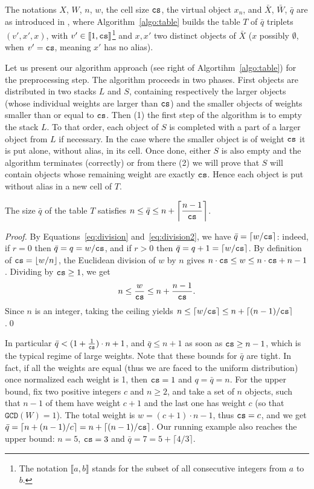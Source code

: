 
The notations $X$, $W$, $n$, $w$, the cell size $\texttt{cs}$, the virtual object $x_n$, and $\bar{X}$, $\bar{W}$,
$\bar{q}$ are as introduced in , where Algorithm~\ref{algo:table} builds the table $T$ of
$\bar{q}$ triplets $(v', x', x)$, with $v' \in \llbracket 1, \texttt{cs} \rrbracket$\footnote{The notation
$\llbracket a, b \rrbracket$ stands for the subset of all consecutive integers from $a$ to $b$.} and $x, x'$
two distinct objects of $\bar{X}$ ($x$ possibly $\emptyset$, when $v'=\texttt{cs}$, meaning $x'$ has no alias). 

Let us present our algorithm approach (see right of  Algortihm~\ref{algo:table}) for the preprocessing step.
The algorithm proceeds in two phases. 
First objects are distributed in two stacks $L$ and $S$,
containing respectively the larger objects (whose individual weights
are larger than $\texttt{cs}$)
and the smaller objects of weights smaller than or equal to $\texttt{cs}$. Then
(1) the first step of the algorithm is to empty the stack $L$.
To that order, each object of $S$ is completed with a part of a larger object from $L$
if necessary. In the case where the smaller object is of weight $\texttt{cs}$ it is put alone, without alias, in its cell.
Once done,  either $S$ is also empty and the algorithm terminates (correctly)
or from there (2) we will prove that $S$ will contain objects whose remaining weight are exactly $\texttt{cs}$. Hence each object is put
without alias in a new cell of $T$.


\begin{proposition}
\label{prop:size_table}
    The size $\bar{q}$ of the table $T$ satisfies $\displaystyle{n \leq \bar{q} \leq n + \left\lceil \frac{n-1}{\texttt{cs}} \right\rceil}$.
\end{proposition}
\begin{proof}
    By Equations~\eqref{eq:division} and~\eqref{eq:division2}, we have $\bar{q} = \lceil w/\texttt{cs} \rceil$:
    indeed, if $r=0$ then $\bar{q} = q = w/\texttt{cs}$, and if $r>0$ then $\bar{q} = q+1 = \lceil w/\texttt{cs} \rceil$.
    By definition of $\texttt{cs} = \lfloor w/n \rfloor$, the Euclidean division of $w$ by $n$ gives
    $n \cdot \texttt{cs} \leq w \leq n\cdot \texttt{cs} + n - 1$. Dividing by $\texttt{cs} \geq 1$, we get
    \[
        n \leq \frac{w}{\texttt{cs}} \leq n + \frac{n-1}{\texttt{cs}}.
    \]
    Since $n$ is an integer, taking the ceiling yields $n \leq \lceil w/\texttt{cs} \rceil \leq n + \lceil (n-1)/\texttt{cs} \rceil$.\qed
\end{proof}
In particular $\bar{q} < (1+\frac{1}{\texttt{cs}})\cdot n + 1$, and $\bar{q} \leq n+1$ as soon as $\texttt{cs} \geq n-1$,
which is the typical regime of large weights.
Note that these bounds for $\bar{q}$ are tight. In fact, if all the weights are equal (thus we are faced to the uniform distribution)
once normalized each weight is 1, then $\texttt{cs} = 1$ and $q=\bar{q} = n$.
For the upper bound, fix two positive integers $c$ and $n \geq 2$, and take a set of $n$ objects, such that
$n-1$ of them have weight $c+1$ and the last one has weight $c$ (so that $\texttt{GCD}(W)=1$).
The total weight is $w = (c+1)\cdot n - 1$, thus $\texttt{cs} = c$, and we get
$\bar{q} = \lceil n + (n-1)/c \rceil = n + \lceil (n-1)/\texttt{cs} \rceil$.
Our running example also reaches the upper bound: $n=5$, $\texttt{cs}=3$ and $\bar{q} = 7 = 5 + \lceil 4/3 \rceil$.


